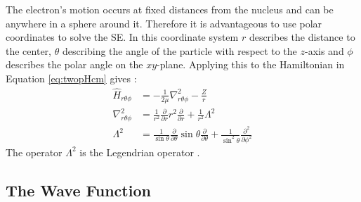 \documentclass[../master_thesis.tex]{subfiles}
\begin{document}
The electron's motion occurs at fixed distances from the nucleus and can be
anywhere in a sphere around it. Therefore it is advantageous to use polar
coordinates to solve the \ac{SE}. In this coordinate system $r$ describes the
distance to the center, $\theta$ describing the angle of the particle with
respect to the $z$-axis and $\phi$ describes the polar angle on the
$xy$-plane. Applying this to the Hamiltonian in Equation \ref{eq:twopHcm} gives
\cite{Atkins:2014}:
\begin{equation}
  \begin{split}\label{eq:SphHcm}
    \hat{H}_{r\theta\phi} &= -\frac{1}{2\mu}\nabla^2_{r\theta\phi}
                          -\frac{Z}{r}\\
    \nabla^2_{r\theta\phi} &=  \frac{1}{r^2}\frac{\partial}{\partial r}
                                  r^2\frac{\partial}{\partial r}
                                  + \frac{1}{r^2}\Lambda^2 \\
    \Lambda^2 &= \frac{1}{\sin{\theta}}\frac{\partial}{
                 \partial\theta}\sin{\theta}\frac{\partial}{\partial\theta}
                 + \frac{1}{\sin^2{\theta}}\frac{\partial^2}{\partial\phi^2}
  \end{split}
\end{equation}
The operator $\Lambda^2$ is the Legendrian operator \cite{Atkins:2014}.

\subsection{The Wave Function}
\end{document}
